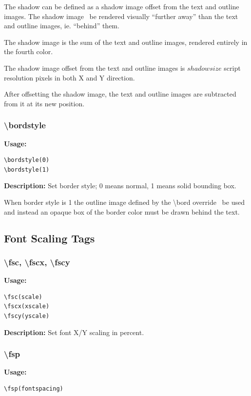 \documentclass{spec}
\begin{document}
The shadow can be defined as a shadow image offset from the text and outline images. The shadow image
\must\ be rendered visually ``further away'' than the text and outline images, ie. ``behind'' them.

The shadow image is the sum of the text and outline images, rendered entirely in the fourth color.

The shadow image offset from the text and outline images is $shadowsize$ script resolution pixels in
both X and Y direction.

After offsetting the shadow image, the text and outline images are subtracted from it at its new position.

\subsubsection{\textbackslash bordstyle}
\textbf{Usage:}
\begin{verbatim}
\bordstyle(0)
\bordstyle(1)
\end{verbatim}

\textbf{Description:}
Set border style; 0 means normal, 1 means solid bounding box.

When border style is 1 the outline image defined by the \textbackslash bord override \mustnot\ be used
and instead an opaque box of the border color must be drawn behind the text.


\subsection{Font Scaling Tags}

\subsubsection{\textbackslash fsc, \textbackslash fscx, \textbackslash fscy}
\textbf{Usage:}
\begin{verbatim}
\fsc(scale)
\fscx(xscale)
\fscy(yscale)
\end{verbatim}

\textbf{Description:}
Set font X/Y scaling in percent.


\subsubsection{\textbackslash fsp}
\textbf{Usage:}
\begin{verbatim}
\fsp(fontspacing)
\end{verbatim}
\end{document}
